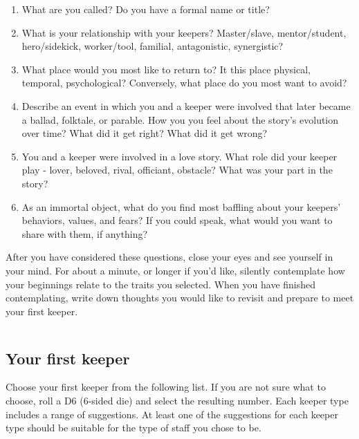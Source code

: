 \documentclass[
  a5paper,
]{article}
\providecommand{\tightlist}{%
  \setlength{\itemsep}{0pt}\setlength{\parskip}{0pt}}
\begin{document}
\begin{enumerate}
\def\labelenumi{\arabic{enumi}.}
\tightlist
\item
  What are you called? Do you have a formal name or title?
\item
  What is your relationship with your keepers? Master/slave, mentor/student, hero/sidekick, worker/tool, familial, antagonistic, synergistic?
\item
  What place would you most like to return to? It this place physical, temporal, psychological? Conversely, what place do you most want to avoid?
\item
  Describe an event in which you and a keeper were involved that later became a ballad, folktale, or parable. How you you feel about the story's evolution over time? What did it get right? What did it get wrong?
\item
  You and a keeper were involved in a love story. What role did your keeper play - lover, beloved, rival, officiant, obstacle? What was your part in the story?
\item
  As an immortal object, what do you find most baffling about your keepers' behaviors, values, and fears? If you could speak, what would you want to share with them, if anything?
\end{enumerate}

After you have considered these questions, close your eyes and see yourself in your mind. For about a minute, or longer if you'd like, silently contemplate how your beginnings relate to the traits you selected. When you have finished contemplating, write down thoughts you would like to revisit and prepare to meet your first keeper.

\pagebreak

\(~\)

\hypertarget{your-first-keeper}{%
\subsection{Your first keeper}\label{your-first-keeper}}

Choose your first keeper from the following list. If you are not sure what to choose, roll a D6 (6-sided die) and select the resulting number. Each keeper type includes a range of suggestions. At least one of the suggestions for each keeper type should be suitable for the type of staff you chose to be.
\end{document}
